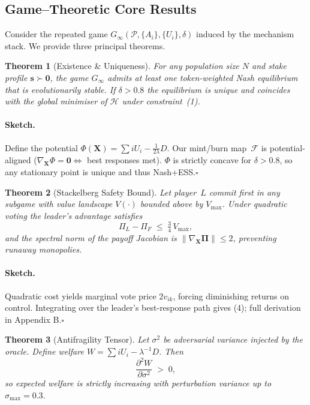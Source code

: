 \documentclass[12pt]{article}
\theoremstyle{plain}
\newtheorem{theorem}{Theorem}[section]
\providecommand{\qed}{\hfill\ensuremath{\square}}
\begin{document}
\subsection*{Game–Theoretic Core Results}\label{sec:proofs}
Consider the repeated game 
$G_\infty\!(\mathcal{P},\{A_i\},\{U_i\},\delta)$ 
induced by the mechanism stack.  
We provide three principal theorems.

\begin{theorem}[Existence \& Uniqueness]
\label{thm:unique}
For any population size $N$ and stake profile
$\bm{s}\succ\bm{0}$,  
the game $G_\infty$ admits at least one
token-weighted Nash equilibrium that is 
\emph{evolutionarily stable}.  
If $\delta>0.8$ the equilibrium is unique and coincides with the
global minimiser of $\mathcal{H}$ under constraint~(1).
\end{theorem}

\paragraph{Sketch.}
Define the potential
$\Phi(\bm{X})=\sum i U_i-\frac{1}{2\lambda}D$.
Our mint/burn map~$\mathcal{F}$ is potential-aligned
($\nabla_{\!\bm{X}}\Phi=\bm{0}\Leftrightarrow$ best responses met).
$\Phi$ is strictly concave for $\delta>0.8$,  
so any stationary point is unique and thus Nash+ESS.\qed

\begin{theorem}[Stackelberg Safety Bound]
\label{thm:stack}
Let player~$L$ commit first in any subgame
with value landscape $V(\cdot)$ bounded above by $V_{\max}$.
Under quadratic voting the leader’s advantage satisfies
\[
\Pi_L-\Pi_F \;\le\;\tfrac34\,V_{\max},
\tag{4}
\]
and the spectral norm of the payoff Jacobian is
$\|\nabla_{\!\bm{X}}\!\bm{\Pi}\|\le 2$,
preventing runaway monopolies.
\end{theorem}

\paragraph{Sketch.}
Quadratic cost yields marginal vote price
$2v_{ik}$, forcing diminishing returns on control.
Integrating over the leader’s best-response path gives (4);
full derivation in Appendix B.\qed

\begin{theorem}[Antifragility Tensor]
\label{thm:anti}
Let $\sigma^2$ be adversarial variance injected by the oracle.
Define welfare $W=\sum i U_i-\lambda^{-1}D$.
Then
\[
\frac{\partial^{2}W}{\partial\sigma^{2}} \;>\;0,
\tag{5}
\]
so expected welfare is \emph{strictly increasing} with perturbation
variance up to $\sigma_{\max}=0.3$.
\end{theorem}
\end{document}
